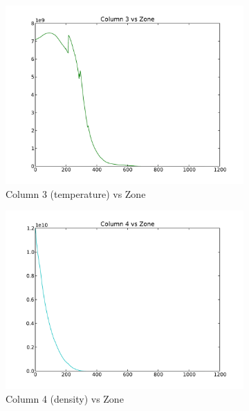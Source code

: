 \documentclass[11pt,letterpaper]{article}
\begin{document}
\begin{figure}[bth]
\centering
\begin{subfigure}{.5\textwidth}
  \centering
  \includegraphics[width=.95\linewidth]{temp_vs_zone.pdf}
  \caption*{Column 3 (temperature) vs Zone}
  \label{fig:sub3}
\end{subfigure}%
\begin{subfigure}{.5\textwidth}
  \centering
  \includegraphics[width=.95\linewidth]{density_vs_zone.pdf}
  \caption*{Column 4 (density) vs Zone}
  \label{fig:sub4}
\end{subfigure}
\caption{}
\label{fig:cols34}
\end{figure}
\end{document}
